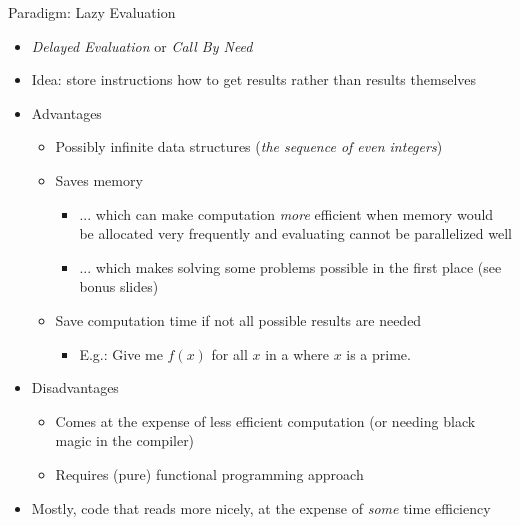 \begin{frame}{Paradigm: Lazy Evaluation}
%
\begin{itemize}
\item \emph{Delayed Evaluation} or \emph{Call By Need}
\item Idea: store instructions how to get results rather than results themselves
\item Advantages
	\begin{itemize}
	\item Possibly infinite data structures (\zB \emph{the sequence of even integers})
	\item Saves memory 
		\begin{itemize}
		\item ... which can make computation \emph{more} efficient when memory would be allocated very frequently and evaluating cannot be parallelized well
		\item ... which makes solving some problems possible in the first place (see bonus slides)
		\end{itemize}
	\item Save computation time if not all possible results are needed
		\begin{itemize}
		\item E.\;g.: Give me $f(x)$ for all $x$ in a  where $x$ is a prime.
		\end{itemize}
	\end{itemize}
\item Disadvantages
	\begin{itemize}
	\item Comes at the expense of less efficient computation (or needing black magic in the compiler)
	\item Requires (pure) functional programming approach
	\end{itemize}
\item Mostly, code that reads more nicely, at the expense of \emph{some} time efficiency
\end{itemize}
%
\end{frame}


